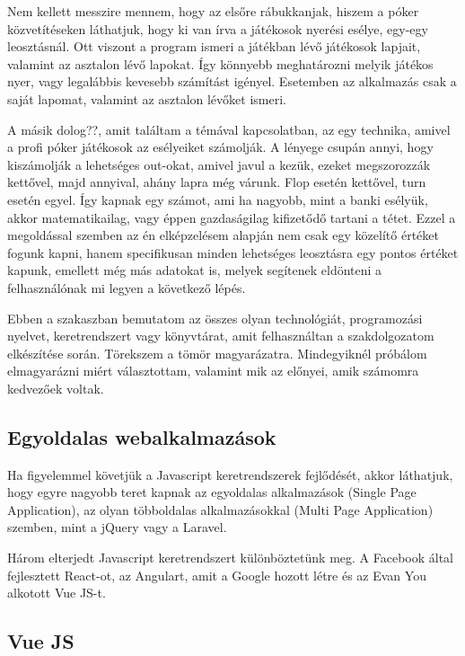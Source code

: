 Nem kellett messzire mennem, hogy az elsőre rábukkanjak, hiszem a póker közvetítéseken láthatjuk, hogy ki van írva a játékosok nyerési esélye, egy-egy leosztásnál. Ott viszont a program ismeri a játékban lévő játékosok lapjait, valamint az asztalon lévő lapokat. Így könnyebb meghatározni melyik játékos nyer, vagy legalábbis kevesebb számítást igényel. Esetemben az alkalmazás csak a saját lapomat, valamint az asztalon lévőket ismeri.

A másik dolog??, amit találtam a témával kapcsolatban, az egy technika, amivel a profi póker játékosok az esélyeiket számolják. A lényege csupán annyi, hogy kiszámolják a lehetséges out-okat, amivel javul a kezük, ezeket megszorozzák kettővel, majd annyival, ahány lapra még várunk. Flop esetén kettővel, turn esetén egyel. Így kapnak egy számot, ami ha nagyobb, mint a banki esélyük, akkor matematikailag, vagy éppen gazdaságilag kifizetődő tartani a tétet. Ezzel a megoldással szemben az én elképzelésem alapján nem csak egy közelítő értéket fogunk kapni, hanem specifikusan minden lehetséges leosztásra egy pontos értéket kapunk, emellett még más adatokat is, melyek segítenek eldönteni a felhasználónak mi legyen a következő lépés.

Ebben a szakaszban bemutatom az összes olyan technológiát, programozási nyelvet, keretrendszert vagy könyvtárat, amit felhasználtan a szakdolgozatom elkészítése során. Törekszem a tömör magyarázatra. Mindegyiknél próbálom elmagyarázni miért választottam, valamint mik az előnyei, amik számomra kedvezőek voltak.

\subsection{Egyoldalas webalkalmazások}

Ha figyelemmel követjük a Javascript keretrendszerek fejlődését, akkor láthatjuk, hogy egyre nagyobb teret kapnak az egyoldalas alkalmazások (Single Page Application), az olyan többoldalas alkalmazásokkal (Multi Page Application) szemben, mint a jQuery vagy a Laravel.

Három elterjedt Javascript keretrendszert különböztetünk meg. A Facebook által fejlesztett React-ot, az Angulart, amit a Google hozott létre és az Evan You alkotott Vue JS-t.

\subsection{Vue JS}

